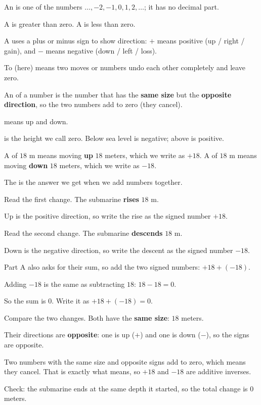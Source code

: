 \begin{words}
  \item An is one of the numbers $\ldots, -2, -1, 0, 1, 2, \ldots$; it has no decimal part.
  \item A is greater than zero. A is less than zero.
  \item A uses a plus or minus sign to show direction:
        $+$ means positive (up / right / gain), and $-$ means negative (down / left / loss).
  \item To (here) means two moves or numbers undo each other completely and leave zero.
  \item An of a number is the number that has the \textbf{same size} but the
        \textbf{opposite direction}, so the two numbers add to zero (they cancel).
  \item {}means up and down.
  \item {}is the height we call zero. Below sea level is negative; above is positive.
  \item A of $18$ m means moving \textbf{up} $18$ meters, which we write as $+18$.
        A of $18$ m means moving \textbf{down} $18$ meters, which we write as $-18$.
  \item The is the answer we get when we add numbers together.
\end{words}

\begin{steps}
  \item {}Read the first change. The submarine \textbf{rises} $18$ m.
  \item Up is the positive direction, so write the rise as the signed number $+18$.
  \item Read the second change. The submarine \textbf{descends} $18$ m.
  \item Down is the negative direction, so write the descent as the signed number $-18$.
  \item Part A also asks for their sum, so add the two signed numbers: $+18 + (-18)$.
  \item Adding $-18$ is the same as subtracting $18$: $18 - 18 = 0$.
  \item So the sum is $0$. Write it as $+18 + (-18) = 0$.
  \item {}Compare the two changes. Both have the \textbf{same size}: $18$ meters.
  \item Their directions are \textbf{opposite}: one is up ($+$) and one is down ($-$), so the
        signs are opposite.
  \item Two numbers with the same size and opposite signs add to zero, which means they cancel.
        That is exactly what means, so $+18$ and $-18$ are additive inverses.
  \item Check: the submarine ends at the same depth it started, so the total change is $0$ meters.
\end{steps}

